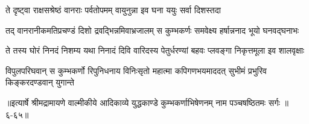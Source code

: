 \twolineshloka
{ते दृष्ट्वा राक्षसश्रेष्ठं वानराः पर्वतोपमम्}
{वायुनुन्ना इव घना ययुः सर्वा दिशस्तदा} %

\twolineshloka
{तद् वानरानीकमतिप्रचण्डं दिशो द्रवद्भिन्नमिवाभ्रजालम्}
{स कुम्भकर्णः समवेक्ष्य हर्षान्ननाद भूयो घनवद्घनाभः} %

\twolineshloka
{ते तस्य घोरं निनदं निशम्य यथा निनादं दिवि वारिदस्य}
{पेतुर्धरण्यां बहवः प्लवङ्गा निकृत्तमूला इव शालवृक्षाः} %

\twolineshloka
{विपुलपरिघवान् स कुम्भकर्णो रिपुनिधनाय विनिःसृतो महात्मा}
{कपिगणभयमाददत् सुभीमं प्रभुरिव किङ्करदण्डवान् युगान्ते} %


॥इत्यार्षे श्रीमद्रामायणे वाल्मीकीये आदिकाव्ये युद्धकाण्डे कुम्भकर्णाभिषेणनम् नाम पञ्चषष्ठितमः सर्गः ॥६-६५॥
